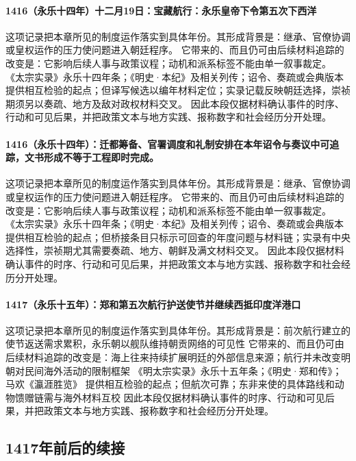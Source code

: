 \paragraph{1416（永乐十四年）十二月19日：宝藏航行：永乐皇帝下令第五次下西洋} 这项记录把本章所见的制度运作落实到具体年份。其形成背景是：继承、官僚协调或皇权运作的压力使问题进入朝廷程序。 它带来的、而且仍可由后续材料追踪的改变是：它影响后续人事与政策议程；动机和派系标签不能由单一叙事裁定。 《太宗实录》永乐十四年条；《明史·本纪》及相关列传；诏令、奏疏或会典版本 提供相互检验的起点；但译写候选以编年材料定位；实录记载反映朝廷选择，崇祯期须另以奏疏、地方及敌对政权材料交叉。 因此本段仅据材料确认事件的时序、行动和可见后果，并把政策文本与地方实践、报称数字和社会经历分开处理。

\paragraph{1416（永乐十四年）：迁都筹备、官署调度和礼制安排在本年诏令与奏议中可追踪，文书形成不等于工程即时完成。} 这项记录把本章所见的制度运作落实到具体年份。其形成背景是：继承、官僚协调或皇权运作的压力使问题进入朝廷程序。 它带来的、而且仍可由后续材料追踪的改变是：它影响后续人事与政策议程；动机和派系标签不能由单一叙事裁定。 《太宗实录》永乐十四年条；《明史·本纪》及相关列传；诏令、奏疏或会典版本 提供相互检验的起点；但桥接条目只标示可回查的年度问题与材料链；实录有中央选择性，崇祯期尤其需要奏疏、地方、朝鲜及满文材料交叉。 因此本段仅据材料确认事件的时序、行动和可见后果，并把政策文本与地方实践、报称数字和社会经历分开处理。

\paragraph{1417（永乐十五年）：郑和第五次航行护送使节并继续西抵印度洋港口} 这项记录把本章所见的制度运作落实到具体年份。其形成背景是：前次航行建立的使节返送需求累积，永乐朝以舰队维持朝贡网络的可见性 它带来的、而且仍可由后续材料追踪的改变是：海上往来持续扩展明廷的外部信息来源；航行并未改变明朝对民间海外活动的限制框架 《明太宗实录》永乐十五年条；《明史·郑和传》；马欢《瀛涯胜览》 提供相互检验的起点；但航次可靠；东非来使的具体路线和动物馈赠链需与海外材料互校 因此本段仅据材料确认事件的时序、行动和可见后果，并把政策文本与地方实践、报称数字和社会经历分开处理。

\subsection{1417年前后的续接}

